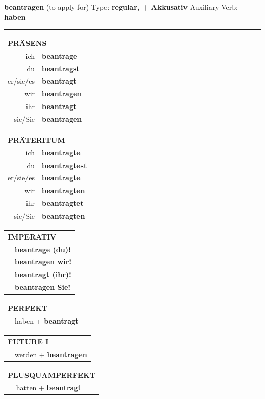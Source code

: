 \documentclass[10pt,a4paper]{revtex4-2}
\begin{document}
\begin{verbbox-acc}
{\Large \bf beantragen} (to apply for) \hfill Type: \textbf{regular, + Akkusativ} \hfill Auxiliary Verb: \textbf{haben}

\vspace{5pt}
\hrule
\vspace{5pt}

\begin{tabular}{rl}
\multicolumn{2}{l}{\textbf{PRÄSENS}}\\
ich & \textbf{beantrage}\\
du & \textbf{beantragst}\\
er/sie/es & \textbf{beantragt}\\
wir & \textbf{beantragen}\\
ihr & \textbf{beantragt}\\
sie/Sie & \textbf{beantragen}\\
\end{tabular}
\hfill
\begin{tabular}{rl}
\multicolumn{2}{l}{\textbf{PRÄTERITUM}}\\
ich & \textbf{beantragte}\\
du & \textbf{beantragtest}\\
er/sie/es & \textbf{beantragte}\\
wir & \textbf{beantragten}\\
ihr & \textbf{beantragtet}\\
sie/Sie & \textbf{beantragten}\\
\end{tabular}
\hfill
\begin{tabular}{rl}
\multicolumn{2}{l}{\textbf{IMPERATIV}}\\
& \textbf{beantrage (du)!}\\
& \textbf{beantragen wir!}\\
& \textbf{beantragt (ihr)!}\\
& \textbf{beantragen Sie!}\\
\end{tabular}

\vspace{10pt}

\begin{tabular}{rl}
\multicolumn{2}{l}{\textbf{PERFEKT}}\\
& haben + \textbf{beantragt}\\
\end{tabular}
\hfill
\begin{tabular}{rl}
\multicolumn{2}{l}{\textbf{FUTURE I}}\\
& werden + \textbf{beantragen}\\
\end{tabular}
\hfill
\begin{tabular}{rl}
\multicolumn{2}{l}{\textbf{PLUSQUAMPERFEKT}}\\
& hatten + \textbf{beantragt}\\
\end{tabular}


\end{verbbox-acc}
\end{document}
